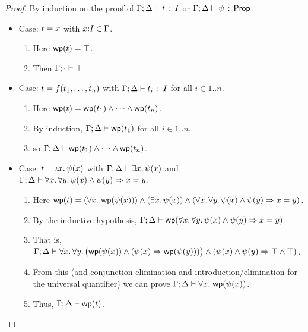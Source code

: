\documentclass[10pt,a4paper]{article}
\begin{document}
\begin{proof}
  \raggedright By induction on the proof of
  $\Gamma;\Delta \vdash t\, :\, I$ or $\Gamma;\Delta \vdash \psi\, :\, \mathsf{Prop}$.
  \begin{itemize}
  \item Case: $t = x$ with $x{:}I\in\Gamma$.  
    \begin{enumerate}
      \item
        Here $\mathop{\mathsf{wp}}(t) = \top$.
      \item
        Then $\Gamma;\cdot \vdash \top$ 
      \end{enumerate}
  \item Case: $t = f({t}_1,\ldots,{t}_{n})$ with
    $\Gamma;\Delta \vdash t_i\, :\, I$ for all $i\in1..n$.
    \begin{enumerate}
    \item
      Here $\mathop{\mathsf{wp}}(t) =
      \mathop{\mathsf{wp}}(t_1) \wedge \cdots \wedge \mathop{\mathsf{wp}}(t_n)$.
    \item 
    	By induction,
      $\Gamma;\Delta \vdash \mathop{\mathsf{wp}}(t_1)$ for
      all $i\in1..n$, 
    \item 
    	so
    $\Gamma;\Delta \vdash \mathop{\mathsf{wp}}(t_1) \wedge \cdots \wedge \mathop{\mathsf{wp}}(t_n)$.
    \end{enumerate}
    
  \item Case: $t = \iota x.\, \psi(x)$ with
  $\Gamma;\Delta \vdash \exists x.\, \psi(x)$ and 
  $\Gamma;\Delta \vdash \forall x.\, \forall y.\, \psi(x) \wedge \psi(y) \Rightarrow x=y$.

    \begin{enumerate}
      \item 
        Here
        $\mathop{\mathsf{wp}}(t) = 
        (\forall x.\, \mathop{\mathsf{wp}}(\psi(x))) \wedge (\exists x.\, \psi(x)) \wedge (\forall x.\, \forall y.\, \psi(x) \wedge \psi(y) \Rightarrow x=y)$.
      \item 
        By the inductive hypothesis, 
        $\Gamma;\Delta \vdash \mathop{\mathsf{wp}}(\forall x.\, \forall y.\, \psi(x) \wedge \psi(y) \Rightarrow x=y)$.
      \item
      	That is, 
	$\Gamma;\Delta \vdash \forall x.\, \forall y.\, \bigl(\mathop{\mathsf{wp}}(\psi(x)) \wedge (\psi(x) \Rightarrow \mathop{\mathsf{wp}}(\psi(y)))\bigr) \wedge (\psi(x) \wedge \psi(y) \Rightarrow \top \wedge \top)$.
	  \item
	    From this (and conjunction elimination and introduction/elimination
	    for the universal quantifier) we can prove 
	      $\Gamma;\Delta \vdash \forall x.\, \mathop{\mathsf{wp}}(\psi(x))$.
      \item 
        Thus, $\Gamma;\Delta \vdash \mathop{\mathsf{wp}}(t)$.
      \end{enumerate}
      

\end{itemize}
\end{proof}
\end{document}
